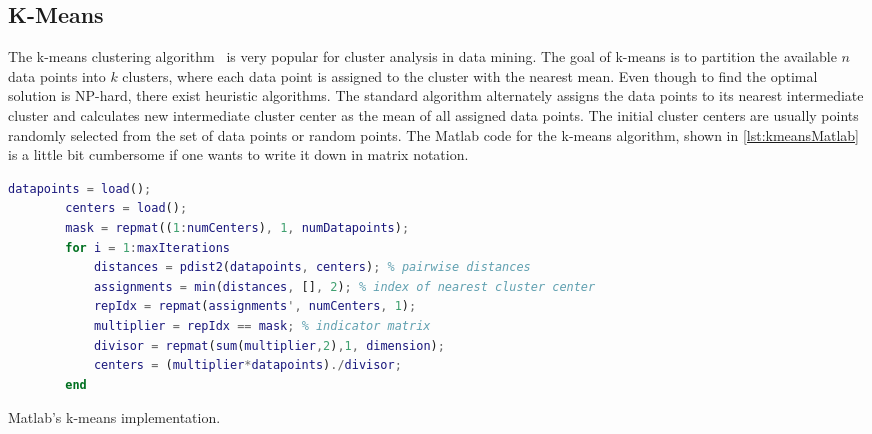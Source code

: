 \subsection{K-Means}

The k-means clustering algorithm~\cite{macqueen:1967a} is very popular for cluster analysis in data mining.
The goal of k-means is to partition the available $n$ data points into $k$ clusters, where each data point is assigned to the cluster with the nearest mean.
Even though to find the optimal solution is NP-hard, there exist heuristic algorithms.
The standard algorithm alternately assigns the data points to its nearest intermediate cluster and calculates new intermediate cluster center as the mean of all assigned data points.
The initial cluster centers are usually points randomly selected from the set of data points or random points.
The Matlab code for the k-means algorithm, shown in \cref{lst:kmeansMatlab} is a little bit cumbersome if one wants to write it down in matrix notation.

\begin{listing}[!h]
	\begin{CenteredBox}
		\begin{lstlisting}[language=Matlab]
		datapoints = load();
		centers = load();
		mask = repmat((1:numCenters), 1, numDatapoints);
		for i = 1:maxIterations
  			distances = pdist2(datapoints, centers); % pairwise distances
  			assignments = min(distances, [], 2); % index of nearest cluster center
  			repIdx = repmat(assignments', numCenters, 1);
  			multiplier = repIdx == mask; % indicator matrix
  			divisor = repmat(sum(multiplier,2),1, dimension);
  			centers = (multiplier*datapoints)./divisor;
		end
		\end{lstlisting}
	\end{CenteredBox}
	\caption{Matlab's k-means implementation.}
	\label{lst:kmeansMatlab}
\end{listing}

